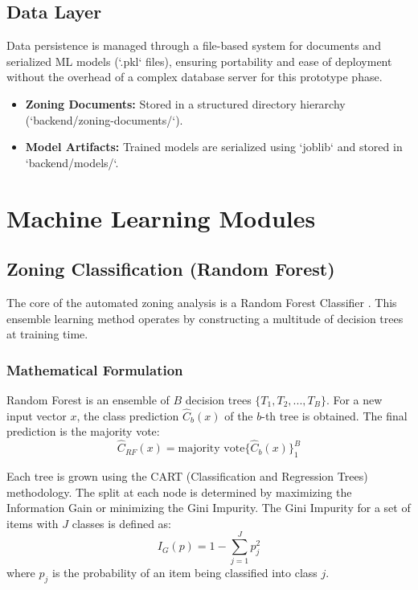 \documentclass[12pt,a4paper]{report}
\begin{document}
\subsection{Data Layer}
Data persistence is managed through a file-based system for documents and serialized ML models (`.pkl` files), ensuring portability and ease of deployment without the overhead of a complex database server for this prototype phase.
\begin{itemize}
    \item \textbf{Zoning Documents:} Stored in a structured directory hierarchy (`backend/zoning-documents/`).
    \item \textbf{Model Artifacts:} Trained models are serialized using `joblib` and stored in `backend/models/`.
\end{itemize}

\section{Machine Learning Modules}

\subsection{Zoning Classification (Random Forest)}
The core of the automated zoning analysis is a Random Forest Classifier \cite{breiman2001random}. This ensemble learning method operates by constructing a multitude of decision trees at training time.

\subsubsection{Mathematical Formulation}
Random Forest is an ensemble of $B$ decision trees $\{T_1, T_2, ..., T_B\}$. For a new input vector $x$, the class prediction $\hat{C}_b(x)$ of the $b$-th tree is obtained. The final prediction is the majority vote:
\begin{equation}
\hat{C}_{RF}(x) = \text{majority vote} \{ \hat{C}_b(x) \}_{1}^{B}
\end{equation}

Each tree is grown using the CART (Classification and Regression Trees) methodology. The split at each node is determined by maximizing the Information Gain or minimizing the Gini Impurity.
The Gini Impurity for a set of items with $J$ classes is defined as:
\begin{equation}
I_G(p) = 1 - \sum_{j=1}^{J} p_j^2
\end{equation}
where $p_j$ is the probability of an item being classified into class $j$.
\end{document}
